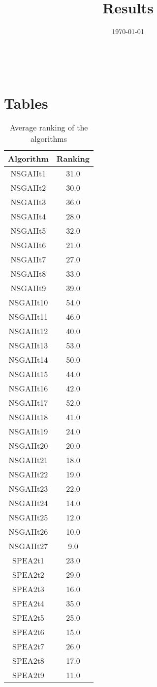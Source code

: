 \documentclass{article}
\title{Results}
\author{}
\date{\today}
\begin{document}
\oddsidemargin 0in \topmargin 0in\maketitle
\
\section{Tables}
\begin{table}[!htp]
\centering
\caption{Average ranking of the algorithms}
\begin{tabular}{c|c}
Algorithm&Ranking\\
\hline
NSGAIIt1&31.0\\
NSGAIIt2&30.0\\
NSGAIIt3&36.0\\
NSGAIIt4&28.0\\
NSGAIIt5&32.0\\
NSGAIIt6&21.0\\
NSGAIIt7&27.0\\
NSGAIIt8&33.0\\
NSGAIIt9&39.0\\
NSGAIIt10&54.0\\
NSGAIIt11&46.0\\
NSGAIIt12&40.0\\
NSGAIIt13&53.0\\
NSGAIIt14&50.0\\
NSGAIIt15&44.0\\
NSGAIIt16&42.0\\
NSGAIIt17&52.0\\
NSGAIIt18&41.0\\
NSGAIIt19&24.0\\
NSGAIIt20&20.0\\
NSGAIIt21&18.0\\
NSGAIIt22&19.0\\
NSGAIIt23&22.0\\
NSGAIIt24&14.0\\
NSGAIIt25&12.0\\
NSGAIIt26&10.0\\
NSGAIIt27&9.0\\
SPEA2t1&23.0\\
SPEA2t2&29.0\\
SPEA2t3&16.0\\
SPEA2t4&35.0\\
SPEA2t5&25.0\\
SPEA2t6&15.0\\
SPEA2t7&26.0\\
SPEA2t8&17.0\\
SPEA2t9&11.0\\

\end{tabular}
\end{table}
\end{document}
